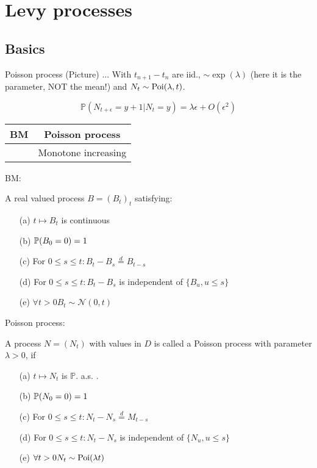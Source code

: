 
\chapter{Levy processes}

\section{Basics}

Poisson process (Picture) ... 
With $t_{n+1}-t_{n}$ are iid., $\sim\exp(\lambda)$ (here it is the parameter, NOT the mean!) and $N_t\sim \text{Poi}(\lambda,t)$.

\[\mathbb{P}(N_{t+\epsilon}=y+1|N_t=y)=\lambda\epsilon+O(\epsilon^2)\]

\begin{center} %
    \begin{tabular}{|c|c|}\hline
        BM  & Poisson process\\\hline
        & Monotone increasing\\\hline
    \end{tabular}
\end{center}

BM:

A real valued process $B=(B_t)_t$ satisfying:\begin{enumerate}
    \item[(a)] $t\mapsto B_t$ is continuous
    \item[(b)] $\mathbb{P}(B_0=0)=1$
    \item[(c)] For $0\leq s\leq t: B_t-B_s\stackrel{d}{=}B_{t-s}$
    \item[(d)] For $0\leq s\leq t: B_t-B_s$ is independent of $\{B_u,u\leq s\}$
    \item[(e)] $\forall t>0B_t\sim \mathcal{N}(0,t)$   
\end{enumerate}

Poisson process: 

A process $N=(N_t)$ with values in $D$ is called a Poisson process with parameter $\lambda>0$, if 
\begin{enumerate}
    \item[(a)] $t\mapsto N_t$ is $\mathbb{P}$. a.s. .
    \item[(b)] $\mathbb{P}(N_0=0)=1$
    \item[(c)] For $0\leq s\leq t: N_t-N_s\stackrel{d}{=}M_{t-s}$
    \item[(d)] For $0\leq s\leq t: N_t-N_s$ is independent of $\{N_u,u\leq s\}$
    \item[(e)] $\forall t>0N_t\sim \text{Poi}(\lambda t)$   
\end{enumerate}

